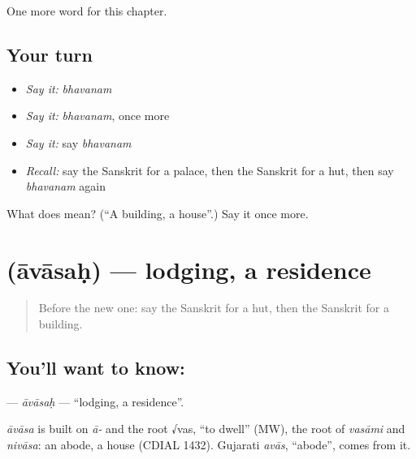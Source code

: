 \begin{grammarlens}[title={What you've built}]
One more word for this chapter.
\end{grammarlens}

\subsection*{Your turn}
\begin{itemize}
\raggedright
  \item \emph{Say it:} \emph{bhavanam}
  \item \emph{Say it:} \emph{bhavanam}, once more
  \item \emph{Say it:} say \emph{bhavanam}
  \item \emph{Recall:} say the Sanskrit for a palace, then the Sanskrit for a hut, then say \emph{bhavanam} again
\end{itemize}

\begin{tcolorbox}[breakable,colback=teal!4,colframe=teal!35!black,title={Before you move on}]
What does  mean? (\textquotedblleft{}A building, a house\textquotedblright{}.) Say it once more.
\end{tcolorbox}
\section[\texorpdfstring{\sk{आवासः} (āvāsaḥ)}{आवासः (āvāsaḥ)}]{ (āvāsaḥ) — lodging, a residence}

\label{lesson:SA-C250-avasah}



\begin{quote}
Before the new one: say the Sanskrit for a hut, then the Sanskrit for a building.
\end{quote}

\subsection*{You'll want to know: }
\textbf{} — \emph{āvāsaḥ} — \textquotedblleft{}lodging, a residence\textquotedblright{}.

\begin{cousinweb}
\emph{āvāsa} is built on \emph{ā-} and the root √vas, \textquotedblleft{}to dwell\textquotedblright{} (MW), the root of \emph{vasāmi} and \emph{nivāsa}: an abode, a house (CDIAL 1432). Gujarati \emph{avās}, \textquotedblleft{}abode\textquotedblright{}, comes from it.
\end{cousinweb}

